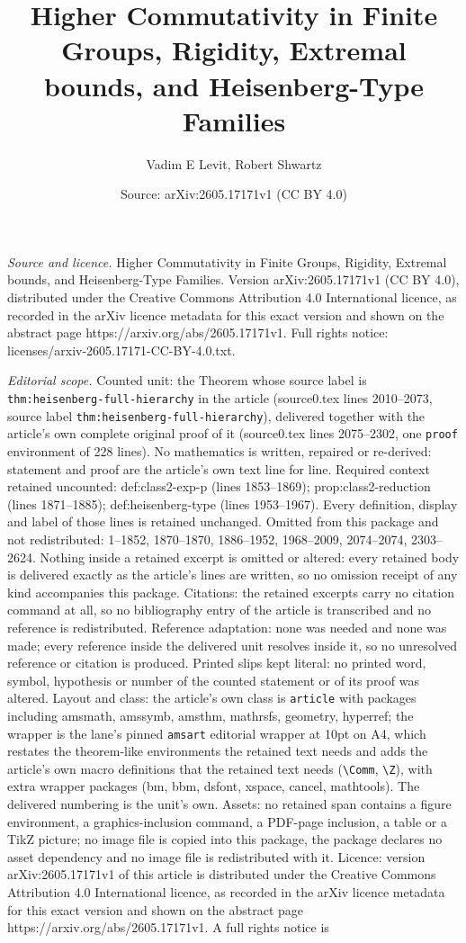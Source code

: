\documentclass[10pt,a4paper]{amsart}
\title[Higher Commutativity in Finite Groups, Rigidity, Extremal bo]{Higher Commutativity in Finite Groups, Rigidity, Extremal bounds, and Heisenberg-Type Families}
\author{Vadim E Levit, Robert Shwartz}
\date{Source: arXiv:2605.17171v1 (CC BY 4.0)}
\begin{document}
\maketitle

\noindent\emph{Source and licence.} Higher Commutativity in Finite Groups, Rigidity, Extremal bounds, and Heisenberg-Type Families. Version arXiv:2605.17171v1 (CC BY 4.0), distributed under the Creative Commons Attribution 4.0 International licence, as recorded in the arXiv licence metadata for this exact version and shown on the abstract page https://arxiv.org/abs/2605.17171v1. Full rights notice: licenses/arxiv-2605.17171-CC-BY-4.0.txt.\par\smallskip

\noindent\textit{Editorial scope.} Counted unit: the Theorem whose source label is \texttt{thm:heisenberg-full-hierarchy} in the article (source0.tex lines 2010--2073, source label \texttt{thm:heisenberg-full-hierarchy}), delivered together with the article's own complete original proof of it (source0.tex lines 2075--2302, one \texttt{proof} environment of 228 lines). No mathematics is written, repaired or re-derived: statement and proof are the article's own text line for line. Required context retained uncounted: def:class2-exp-p (lines 1853--1869); prop:class2-reduction (lines 1871--1885); def:heisenberg-type (lines 1953--1967). Every definition, display and label of those lines is retained unchanged. Omitted from this package and not redistributed: 1--1852, 1870--1870, 1886--1952, 1968--2009, 2074--2074, 2303--2624. Nothing inside a retained excerpt is omitted or altered: every retained body is delivered exactly as the article's lines are written, so no omission receipt of any kind accompanies this package. Citations: the retained excerpts carry no citation command at all, so no bibliography entry of the article is transcribed and no reference is redistributed. Reference adaptation: none was needed and none was made; every reference inside the delivered unit resolves inside it, so no unresolved reference or citation is produced. Printed slips kept literal: no printed word, symbol, hypothesis or number of the counted statement or of its proof was altered. Layout and class: the article's own class is \texttt{article} with packages including amsmath, amssymb, amsthm, mathrsfs, geometry, hyperref; the wrapper is the lane's pinned \texttt{amsart} editorial wrapper at 10pt on A4, which restates the theorem-like environments the retained text needs and adds the article's own macro definitions that the retained text needs (\texttt{\textbackslash Comm}, \texttt{\textbackslash Z}), with extra wrapper packages (bm, bbm, dsfont, xspace, cancel, mathtools). The delivered numbering is the unit's own. Assets: no retained span contains a figure environment, a graphics-inclusion command, a PDF-page inclusion, a table or a TikZ picture; no image file is copied into this package, the package declares no asset dependency and no image file is redistributed with it. Licence: version arXiv:2605.17171v1 of this article is distributed under the Creative Commons Attribution 4.0 International licence, as recorded in the arXiv licence metadata for this exact version and shown on the abstract page https://arxiv.org/abs/2605.17171v1. A full rights notice is 
\end{document}
